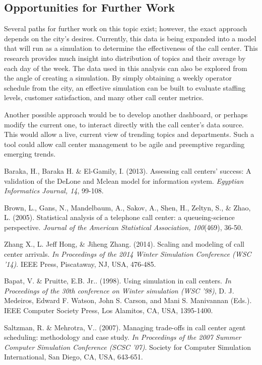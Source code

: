 \documentclass{article}
\begin{document}
	\subsection{Opportunities for Further Work}

Several paths for further work on this topic exist; however, the exact approach depends on the city's desires.  Currently, this data is being expanded into a model that will run as a simulation to determine the effectiveness of the call center.  This research provides much insight into distribution of topics and their average by each day of the week.  The data used in this analysis can also be explored from the angle of creating a simulation.  By simply obtaining a weekly operator schedule from the city, an effective simulation can be built to evaluate staffing levels, customer satisfaction, and many other call center metrics.
\par
Another possible approach would be to develop another dashboard, or perhaps modify the current one, to interact directly with the call center's data source.  This would allow a live, current view of trending topics and departments.  Such a tool could allow call center management to be agile and preemptive regarding emerging trends.



\begin{thebibliography}{5}

Baraka, H., Baraka H. \& El-Gamily, I. (2013). Assessing call centers' success: A validation of the DeLone and Mclean model for information system. \textit{Egyptian Informatics Journal, 14}, 99-108.

Brown, L., Gans, N., Mandelbaum, A., Sakov, A., Shen, H., Zeltyn, S., \& Zhao, L. (2005). Statistical analysis of a telephone call center: a queueing-science perspective. \textit{Journal of the American Statistical Association, 100}(469), 36-50.

Zhang X., L. Jeff Hong, \& Jiheng Zhang. (2014). Scaling and modeling of call center arrivals. \textit{In Proceedings of the 2014 Winter Simulation Conference (WSC '14)}. IEEE Press, Piscataway, NJ, USA, 476-485.

Bapat, V. \& Pruitte, E.B. Jr.. (1998). Using simulation in call centers. \textit{In Proceedings of the 30th conference on Winter simulation (WSC '98)}, D. J. Medeiros, Edward F. Watson, John S. Carson, and Mani S. Manivannan (Eds.). IEEE Computer Society Press, Los Alamitos, CA, USA, 1395-1400.

Saltzman, R. \& Mehrotra, V.. (2007). Managing trade-offs in call center agent scheduling: methodology and case study. \textit{In Proceedings of the 2007 Summer Computer Simulation Conference (SCSC '07)}. Society for Computer Simulation International, San Diego, CA, USA, 643-651.

\end{thebibliography}
\newpage
\end{document}
